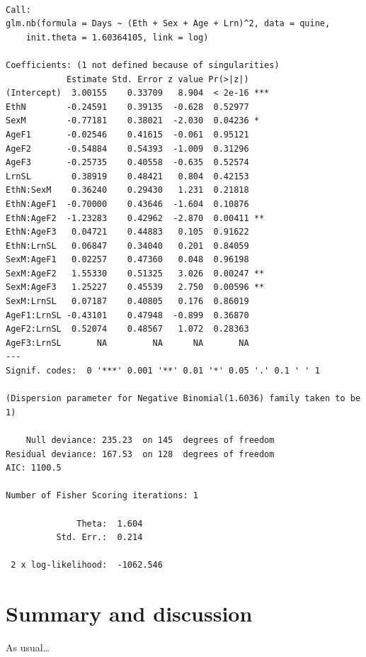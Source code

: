 \documentclass[
  nojss,
  article]{jss}
\begin{document}
\begin{verbatim}

Call:
glm.nb(formula = Days ~ (Eth + Sex + Age + Lrn)^2, data = quine, 
    init.theta = 1.60364105, link = log)

Coefficients: (1 not defined because of singularities)
            Estimate Std. Error z value Pr(>|z|)    
(Intercept)  3.00155    0.33709   8.904  < 2e-16 ***
EthN        -0.24591    0.39135  -0.628  0.52977    
SexM        -0.77181    0.38021  -2.030  0.04236 *  
AgeF1       -0.02546    0.41615  -0.061  0.95121    
AgeF2       -0.54884    0.54393  -1.009  0.31296    
AgeF3       -0.25735    0.40558  -0.635  0.52574    
LrnSL        0.38919    0.48421   0.804  0.42153    
EthN:SexM    0.36240    0.29430   1.231  0.21818    
EthN:AgeF1  -0.70000    0.43646  -1.604  0.10876    
EthN:AgeF2  -1.23283    0.42962  -2.870  0.00411 ** 
EthN:AgeF3   0.04721    0.44883   0.105  0.91622    
EthN:LrnSL   0.06847    0.34040   0.201  0.84059    
SexM:AgeF1   0.02257    0.47360   0.048  0.96198    
SexM:AgeF2   1.55330    0.51325   3.026  0.00247 ** 
SexM:AgeF3   1.25227    0.45539   2.750  0.00596 ** 
SexM:LrnSL   0.07187    0.40805   0.176  0.86019    
AgeF1:LrnSL -0.43101    0.47948  -0.899  0.36870    
AgeF2:LrnSL  0.52074    0.48567   1.072  0.28363    
AgeF3:LrnSL       NA         NA      NA       NA    
---
Signif. codes:  0 '***' 0.001 '**' 0.01 '*' 0.05 '.' 0.1 ' ' 1

(Dispersion parameter for Negative Binomial(1.6036) family taken to be 1)

    Null deviance: 235.23  on 145  degrees of freedom
Residual deviance: 167.53  on 128  degrees of freedom
AIC: 1100.5

Number of Fisher Scoring iterations: 1

              Theta:  1.604 
          Std. Err.:  0.214 

 2 x log-likelihood:  -1062.546 
\end{verbatim}

\section{Summary and discussion}\label{sec-summary}

\begin{tcolorbox}[enhanced jigsaw, colframe=quarto-callout-color-frame, colback=white, rightrule=.15mm, toprule=.15mm, breakable, arc=.35mm, bottomrule=.15mm, leftrule=.75mm, left=2mm, opacityback=0]

As usual\ldots{}

\end{tcolorbox}
\end{document}
